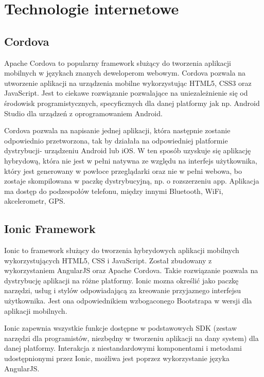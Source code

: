 \section{Technologie internetowe}
\subsection{Cordova} %
Apache Cordova to popularny framework służący do tworzenia aplikacji mobilnych w językach znanych deweloperom webowym. Cordova pozwala na utworzenie aplikacji na urządzenia mobilne wykorzystując HTML5, CSS3 oraz JavaScript. Jest to ciekawe rozwiązanie pozwalające na uniezależnienie się od środowisk programistycznych, specyficznych dla danej platformy jak np. Android Studio dla urządzeń z oprogramowaniem Android.

Cordova pozwala na napisanie jednej aplikacji, która następnie zostanie odpowiednio przetworzona, tak by działała na odpowiedniej platformie dystrybucji- urządzeniu Android lub iOS. W ten sposób uzyskuje się aplikację hybrydową, która nie jest w pełni natywna ze względu na interfejs użytkownika, który jest generowany w powłoce przeglądarki oraz nie w pełni webowa, bo zostaje skompilowana w paczkę dystrybucyjną, np. o rozszerzeniu app. Aplikacja ma dostęp do podzespołów telefonu, między innymi Bluetooth, WiFi, akcelerometr, GPS. 

\subsection{Ionic Framework}%
Ionic to framework służący do tworzenia hybrydowych aplikacji mobilnych wykorzystujących HTML5, CSS i JavaScript. Został zbudowany z wykorzystaniem AngularJS oraz Apache Cordova. Takie rozwiązanie pozwala na dystrybucję aplikacji na różne platformy. Ionic mozna określić jako paczkę narzędzi, usług i stylów odpowiadającą za kreowanie przyjaznego interfejsu użytkownika. Jest ona odpowiednikiem wzbogaconego Bootstrapa w wersji dla aplikacji mobilnych.

Ionic zapewnia wszystkie funkcje dostępne w podstawowych SDK (zestaw narzędzi dla programistów, niezbędny w tworzeniu aplikacji na dany system) dla danej platformy. Interakcja z niestandardowymi komponentami i metodami udostępnionymi przez Ionic, możliwa jest poprzez wykorzystanie języka AngularJS.

